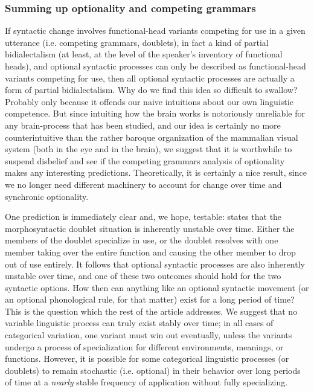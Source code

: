 \subsubsection{Summing up optionality and competing grammars}
If syntactic change involves functional-head variants competing for use in a given utterance (i.e. competing grammars, doublets), in fact a kind of partial bidialectalism (at least, at the level of the speaker's inventory of functional heads), and optional syntactic processes can only be described as functional-head variants competing for use, then all optional syntactic processes are actually a form of partial bidialectalism.
Why do we find this idea so difficult to swallow? Probably only because it offends our naive intuitions about our own linguistic competence.
But since intuiting how the brain works is notoriously unreliable for any brain-process that has been studied, and our idea is certainly no more counterintuitive than the rather baroque organization of the mammalian visual system (both in the eye and in the brain), we suggest that it is worthwhile to suspend disbelief and see if the competing grammars analysis of optionality makes any interesting predictions.
Theoretically, it is certainly a nice result, since we no longer need different machinery to account for change over time and synchronic optionality.


One prediction is immediately clear and, we hope, testable: \citet{kroch1989,kroch1994} states that the morphosyntactic doublet situation is inherently unstable over time.
Either the members of the doublet specialize in use, or the doublet resolves with one member taking over the entire function and causing the other member to drop out of use entirely.
It follows that optional syntactic processes are also inherently unstable over time, and one of these two outcomes should hold for the two syntactic options.
How then can anything like an optional syntactic movement (or an optional phonological rule, for that matter) exist for a long period of time? This is the question which the rest of the article addresses.
We suggest that no variable linguistic process can truly exist stably over time; in all cases of categorical variation, one variant must win out eventually, unless the variants undergo a process of specialization for different environments, meanings, or functions.
However, it is possible for some categorical linguistic processes (or doublets) to remain stochastic (i.e. optional) in their behavior over long periods of time at a \textsl{nearly} stable frequency of application without fully specializing. 


